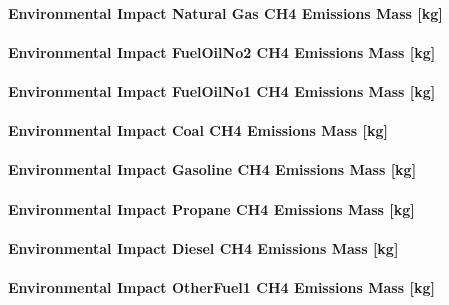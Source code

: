 \paragraph{Environmental Impact Natural Gas CH4 Emissions Mass {[}kg{]}}\label{environmental-impact-natural-gas-ch4-emissions-mass-kg}

\paragraph{Environmental Impact FuelOilNo2 CH4 Emissions Mass {[}kg{]}}\label{environmental-impact-fuel-oil-2-ch4-emissions-mass-kg}

\paragraph{Environmental Impact FuelOilNo1 CH4 Emissions Mass {[}kg{]}}\label{environmental-impact-fuel-oil-1-ch4-emissions-mass-kg}

\paragraph{Environmental Impact Coal CH4 Emissions Mass {[}kg{]}}\label{environmental-impact-coal-ch4-emissions-mass-kg}

\paragraph{Environmental Impact Gasoline CH4 Emissions Mass {[}kg{]}}\label{environmental-impact-gasoline-ch4-emissions-mass-kg}

\paragraph{Environmental Impact Propane CH4 Emissions Mass {[}kg{]}}\label{environmental-impact-propane-ch4-emissions-mass-kg}

\paragraph{Environmental Impact Diesel CH4 Emissions Mass {[}kg{]}}\label{environmental-impact-diesel-ch4-emissions-mass-kg}

\paragraph{Environmental Impact OtherFuel1 CH4 Emissions Mass {[}kg{]}}\label{environmental-impact-otherfuel1-ch4-emissions-mass-kg}

